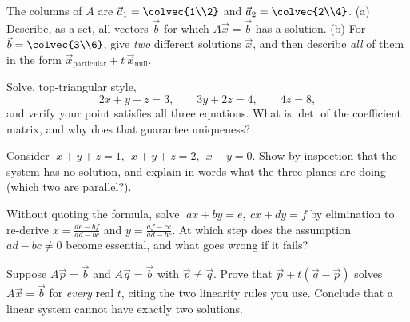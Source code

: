 \begin{exercise}
\label{ch06:ex-reach}
The columns of $A$ are $\vec a_1=\colvec{1\\2}$ and $\vec a_2=\colvec{2\\4}$.
(a) Describe, as a set, all vectors $\vec b$ for which $A\vec x=\vec b$ has a
solution. (b) For $\vec b=\colvec{3\\6}$, give \emph{two} different solutions
$\vec x$, and then describe \emph{all} of them in the form
$\vec x_{\text{particular}}+t\,\vec x_{\text{null}}$.
\end{exercise}

\begin{exercise}
\label{ch06:ex-back}
Solve, top-triangular style,
\[
  2x + y - z = 3,\qquad 3y + 2z = 4,\qquad 4z = 8,
\]
and verify your point satisfies all three equations. What is $\det$ of the
coefficient matrix, and why does that guarantee uniqueness?
\end{exercise}

\begin{exercise}
\label{ch06:ex-prism}
Consider $\;x+y+z=1,\ \ x+y+z=2,\ \ x-y=0$. Show by inspection that the
system has no solution, and explain in words what the three planes are doing
(which two are parallel?).
\end{exercise}

\begin{exercise}
\label{ch06:ex-inverse}
Without quoting the formula, solve $\;ax+by=e,\ cx+dy=f$ by elimination to
re-derive $x=\frac{de-bf}{ad-bc}$ and $y=\frac{af-ce}{ad-bc}$. At which step
does the assumption $ad-bc\neq0$ become essential, and what goes wrong if it
fails?
\end{exercise}

\begin{exercise}
\label{ch06:ex-proof}
Suppose $A\vec p=\vec b$ and $A\vec q=\vec b$ with $\vec p\neq\vec q$. Prove
that $\vec p + t(\vec q-\vec p)$ solves $A\vec x=\vec b$ for \emph{every} real
$t$, citing the two linearity rules you use. Conclude that a linear system
cannot have exactly two solutions.
\end{exercise}

